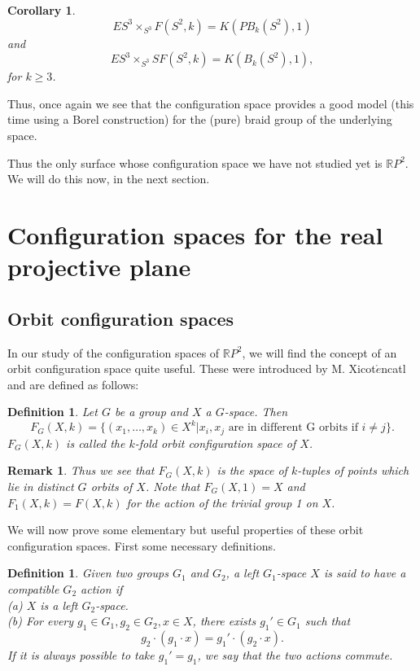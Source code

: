 \documentclass{amsart}
\newtheorem{cor}[thm]{Corollary}
\newtheorem{rem}[thm]{Remark}
\newtheorem{defn}[thm]{Definition}
\begin{document}
\begin{cor}
$$
ES^3 \times_{S^3} F(S^2,k) = K(PB_k(S^2),1)
$$
and 
$$
ES^3 \times_{S^3} SF(S^2,k) = K(B_k(S^2),1),
$$
for $k \geq 3$.
\end{cor}

Thus, once again we see that the configuration space provides
a good model (this time using a Borel construction)
for the (pure) braid group of the underlying space.

Thus the only surface whose configuration space we have not studied
yet is $\mathbb{R}P^2$. We will do this now, in the next section.  

\section{Configuration spaces for the real projective plane}

\subsection{Orbit configuration spaces}

In our study of the configuration spaces of $\mathbb{R}P^2$,
we will find the concept of an orbit configuration space quite
useful. These were introduced by M. Xicot$\acute{e}$ncatl and
are defined as follows:

\begin{defn}
Let $G$ be a group and $X$ a $G$-space. Then 
$$
F_G(X,k) = \{(x_1,\dots, x_k) \in X^k | x_i,x_j \text{ are in different
 G orbits if } i \neq j \}.
$$
$F_G(X,k)$ is called the $k$-fold orbit configuration space of $X$.
\end{defn}

\begin{rem}
Thus we see that $F_G(X,k)$ is the space of $k$-tuples of points 
which lie in distinct $G$ orbits of $X$.
Note that $F_G(X,1)=X$ and $F_1(X,k)=F(X,k)$ for the action of
the trivial group 1 on $X$.
\end{rem}

We will now prove some elementary but useful properties of these orbit
configuration spaces. First some necessary definitions.

\begin{defn}
Given two groups $G_1$ and $G_2$, 
a left $G_1$-space $X$ is said to have a compatible $G_2$ action if \\
(a) $X$ is a left $G_2$-space. \\
(b) For every $g_1 \in G_1, g_2 \in G_2, x \in X$, there
exists $g_1' \in G_1$ such that
$$
g_2 \cdot (g_1 \cdot x) = g_1' \cdot (g_2 \cdot x).
$$ 
If it is always possible to take $g_1'=g_1$, we say that the two actions
commute.
\end{defn}
\end{document}
